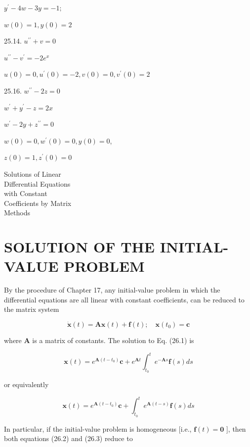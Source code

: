 \documentclass[10pt]{article}
\begin{document}
$y^{\prime}-4 w-3 y=-1 ;$

$w(0)=1, y(0)=2$

25.14. $u^{\prime \prime}+v=0$

$u^{\prime \prime}-v^{\prime}=-2 e^{x}$

$u(0)=0, u^{\prime}(0)=-2, v(0)=0, v^{\prime}(0)=2$

25.16. $w^{\prime \prime}-2 z=0$

$w^{\prime}+y^{\prime}-z=2 x$

$w^{\prime}-2 y+z^{\prime \prime}=0$

$w(0)=0, w^{\prime}(0)=0, y(0)=0$,

$z(0)=1, z^{\prime}(0)=0$

Solutions of Linear\\
Differential Equations\\
with Constant\\
Coefficients by Matrix\\
Methods

\section*{SOLUTION OF THE INITIAL-VALUE PROBLEM}
By the procedure of Chapter 17, any initial-value problem in which the differential equations are all linear with constant coefficients, can be reduced to the matrix system


\begin{equation*}
\dot{\mathbf{x}}(t)=\mathbf{A x}(t)+\mathbf{f}(t) ; \quad \mathbf{x}\left(t_{0}\right)=\mathbf{c} \tag{26.1}
\end{equation*}


where $\mathbf{A}$ is a matrix of constants. The solution to Eq. (26.1) is


\begin{equation*}
\mathbf{x}(t)=e^{\mathbf{A}\left(t-t_{0}\right)} \mathbf{c}+e^{\mathbf{A} t} \int_{t_{0}}^{t} e^{-\mathbf{A} s} \mathbf{f}(s) d s \tag{26.2}
\end{equation*}


or equivalently


\begin{equation*}
\mathbf{x}(t)=e^{\mathbf{A}\left(t-t_{0}\right)} \mathbf{c}+\int_{t_{0}}^{t} e^{\mathbf{A}(t-s)} \mathbf{f}(s) d s \tag{26.3}
\end{equation*}


In particular, if the initial-value problem is homogeneous [i.e., $\mathbf{f}(t)=\mathbf{0}$ ], then both equations (26.2) and (26.3) reduce to
\end{document}
